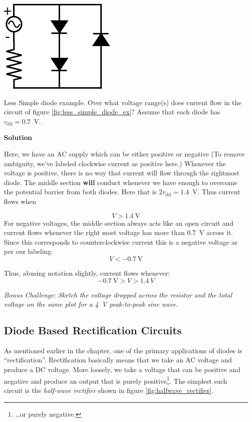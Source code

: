 \documentclass{tufte-book}
\newcommand\Solution{\par\textbf{\textsf{Solution}}\par\medskip}
\begin{document}
\begin{marginfigure}
  \includegraphics[]{less_simple_diode_ex}
  \caption{Less simple diode example.}
  \label{fig:less_simple_diode_ex}
\end{marginfigure}

\begin{myexample}[label = ex:less_simple_diode]{Less Simple diode example.}
Over what voltage range(s) does current flow in the circuit of figure \ref{fig:less_simple_diode_ex}? Assume that each diode has $v_\text{dd} = 0.7$~V.
\Solution
Here, we have an AC supply which can be either positive or negative (To remove ambiguity, we've labeled clockwise current as positive here.) Whenever the voltage is positive, there is no way that current will flow through the rightmost diode. The middle section \textbf{will} conduct whenever we have enough to overcome the potential barrier from both diodes. Here that is $2v_\text{dd} = 1.4$~V. Thus current flows when 

$$
V>1.4~\text{V}
$$
For negative voltages, the middle section always acts like an open circuit and current flows whenever the right most voltage has more than 0.7~V across it. Since this corresponds to counterclockwise current this is a negative voltage as per our labeling:
$$
V<-0.7~\text{V}
$$

Thus, abusing notation slightly, current flows whenever:
$$
-0.7~\text{V} > V > 1.4~V
$$

\textit{Bonus Challenge: Sketch the voltage dropped across the resistor and the total voltage on the same plot for a 4~V peak-to-peak sine wave.}
\end{myexample}

\subsection{Diode Based Rectification Circuits}
As mentioned earlier in the chapter, one of the primary applications of diodes is ``rectification''. Rectification basically means that we take an AC voltage and produce a DC voltage. More loosely, we take a voltage that can be positive and negative and produce an output that is purely positive\footnote{\ldots or purely negative.}. The simplest such circuit is the \textit{half-wave rectifier} shown in figure \ref{fig:halfwave_rectifier}.
\end{document}
